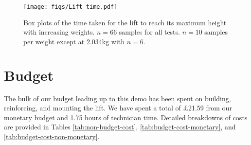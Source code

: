 \documentclass{article}
\begin{document}
\begin{figure}
  \begin{center}
    \texttt{[image: figs/Lift\_time.pdf]}
    \caption{Box plots of the time taken for the lift to reach its maximum height with increasing weights. $n = 66$ samples for all tests. $n = 10$ samples per weight except at 2.034kg with $n = 6$.}
    \label{fig:weight-testing}
  \end{center}
\end{figure}

\section{Budget}
The bulk of our budget leading up to this demo has been spent on building, reinforcing, and mounting the lift. We have spent a total of \pounds 21.59 from our monetary budget and 1.75 hours of technician time. Detailed breakdowns of costs are provided in Tables \ref{tab:non-budget-cost}, \ref{tab:budget-cost-monetary}, and \ref{tab:budget-cost-non-monetary}.

\begin{table}[h]
\begin{center}
\caption{Non-budgeted monetary costs at demo \demoNumber.}
\label{tab:non-budget-cost}
\end{center}
\end{table}
\end{document}
